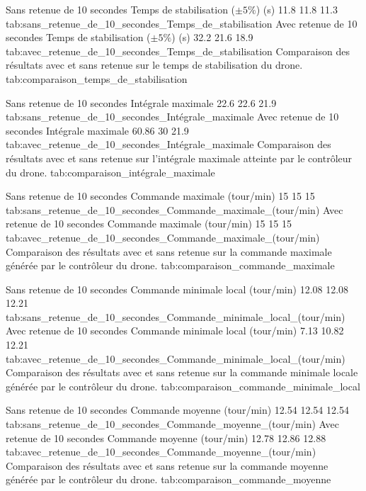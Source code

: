 \DoubleComparisonTable
{
    \ComparisonTable
        {Sans retenue de 10 secondes}
        {Temps de stabilisation ($\pm 5\%$) (s)}
        {11.8}
        {11.8}
        {11.3}
        {tab:sans_retenue_de_10_secondes_Temps_de_stabilisation}
}
{
    \ComparisonTable
        {Avec retenue de 10 secondes}
        {Temps de stabilisation ($\pm 5\%$) (s)}
        {32.2}
        {21.6}
        {18.9}
        {tab:avec_retenue_de_10_secondes_Temps_de_stabilisation}
}
{Comparaison des résultats avec et sans retenue sur le temps de stabilisation du drone.}
{tab:comparaison_temps_de_stabilisation}

\DoubleComparisonTable
{
    \ComparisonTable
        {Sans retenue de 10 secondes}
        {Intégrale maximale}
        {22.6}
        {22.6}
        {21.9}
        {tab:sans_retenue_de_10_secondes_Intégrale_maximale}
}
{
    \ComparisonTable
        {Avec retenue de 10 secondes}
        {Intégrale maximale}
        {60.86}
        {30}
        {21.9}
        {tab:avec_retenue_de_10_secondes_Intégrale_maximale}
}
{Comparaison des résultats avec et sans retenue sur l'intégrale maximale atteinte par le contrôleur du drone.}
{tab:comparaison_intégrale_maximale}

\DoubleComparisonTable
{
    \ComparisonTable
        {Sans retenue de 10 secondes}
        {Commande maximale (tour/min)}
        {15}
        {15}
        {15}
        {tab:sans_retenue_de_10_secondes_Commande_maximale_(tour/min)}
}
{
    \ComparisonTable
        {Avec retenue de 10 secondes}
        {Commande maximale (tour/min)}
        {15}
        {15}
        {15}
        {tab:avec_retenue_de_10_secondes_Commande_maximale_(tour/min)}
}
{Comparaison des résultats avec et sans retenue sur la commande maximale générée par le contrôleur du drone.}
{tab:comparaison_commande_maximale}

\DoubleComparisonTable
{
    \ComparisonTable
        {Sans retenue de 10 secondes}
        {Commande minimale local (tour/min)}
        {12.08}
        {12.08}
        {12.21}
        {tab:sans_retenue_de_10_secondes_Commande_minimale_local_(tour/min)}
}
{
    \ComparisonTable
        {Avec retenue de 10 secondes}
        {Commande minimale local (tour/min)}
        {7.13}
        {10.82}
        {12.21}
        {tab:avec_retenue_de_10_secondes_Commande_minimale_local_(tour/min)}
}
{Comparaison des résultats avec et sans retenue sur la commande minimale locale générée par le contrôleur du drone.}
{tab:comparaison_commande_minimale_local}

\DoubleComparisonTable
{
    \ComparisonTable
        {Sans retenue de 10 secondes}
        {Commande moyenne (tour/min)}
        {12.54}
        {12.54}
        {12.54}
        {tab:sans_retenue_de_10_secondes_Commande_moyenne_(tour/min)}
}
{   
    \ComparisonTable
        {Avec retenue de 10 secondes}
        {Commande moyenne (tour/min)}
        {12.78}
        {12.86}
        {12.88}
        {tab:avec_retenue_de_10_secondes_Commande_moyenne_(tour/min)}
}
{Comparaison des résultats avec et sans retenue sur la commande moyenne générée par le contrôleur du drone.}
{tab:comparaison_commande_moyenne}

